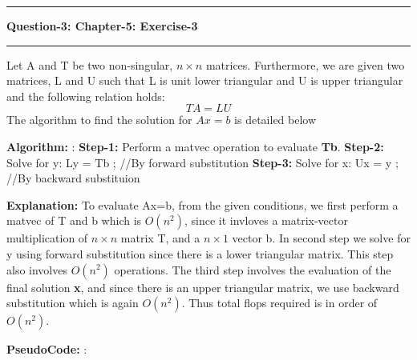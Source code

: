 \documentclass{article}
\newcommand\question[2]{\vspace{.25in}\hrule\textbf{#1: #2}\hrule\vspace{.10in}}
\newcommand\algo{\vspace{.10in}\textbf{Algorithm: }}
\newcommand\pseudoCode{\vspace{.10in}\textbf{PseudoCode: }}
\begin{document}
\question{Question-3}{Chapter-5: Exercise-3}
Let A and T be two non-singular, $n \times n$ matrices. Furthermore, we are given two matrices, L and U such that L is unit lower triangular and U is upper triangular and the following relation holds: \newline
\begin{equation}
   TA = LU
\end{equation}
The algorithm to find the solution for $Ax=b$ is detailed below

\algo:\newline
\textbf {Step-1:} Perform a matvec operation to evaluate \textbf {Tb}. \newline
\textbf {Step-2:} Solve for y: Ly = Tb ; //By forward substitution \newline
\textbf {Step-3:} Solve for x: Ux = y ; //By backward substituion \newline

  \textbf {Explanation: } To evaluate Ax=b, from the given conditions, we first perform a matvec of T and b which is $O(n^2)$, since it invloves a matrix-vector multiplication of $n \times n$ matrix T, and a $n \times 1$ vector b. In second step we solve for y using forward substitution since there is a lower triangular matrix. This step also involves $O(n^2)$ operations. The third step involves the evaluation of the final solution \textbf {x}, and since there is an upper triangular matrix, we use backward substitution which is again $O(n^2)$. Thus total flops required is in order of $O(n^2)$. \newline

\pseudoCode:
  
  
  
  
\end{document}
